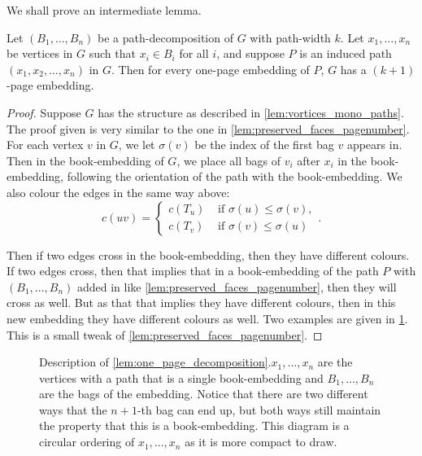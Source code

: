 We shall prove an intermediate lemma.
\begin{lemma}\label{lem:one_page_decomposition}
	Let \((B_1, \ldots, B_n)\) be a path-decomposition of \(G\) with path-width \(k\). Let \(x_1, \ldots, x_n\) be vertices in \(G\) such that \(x_i \in B_i\) for all \(i\), and suppose \(P\) is an induced path \((x_1, x_2, \ldots, x_n)\) in \(G\). Then for every one-page embedding of \(P\), \(G\) has a \((k + 1)\)-page embedding.
\end{lemma}
\begin{proof}
	Suppose \(G\) has the structure as described in \cref{lem:vortices_mono_paths}. 
	The proof given is very similar to the one in \cref{lem:preserved_faces_pagenumber}. For each vertex \(v\) in \(G\), we let \(\sigma(v)\) be the index of the first bag \(v\) appears in. Then in the book-embedding of \(G\), we place all bags of \(v_i\) after \(x_i\) in the book-embedding, following the orientation of the path with the book-embedding. We also colour the edges in the same way above: 
	\begin{equation}
		c(uv) =
		\begin{cases}
			c(T_u) & \text{ if } \sigma(u) \leq \sigma(v), \\
			c(T_v) & \text{ if } \sigma(v) \leq \sigma(u)
		\end{cases}.
	\end{equation}

	Then if two edges cross in the book-embedding, then they have different colours. If two edges cross, then that implies that in a book-embedding of the path \(P\) with \((B_1, \ldots, B_n)\) added in like \cref{lem:preserved_faces_pagenumber}, then they will cross as well. But as that that implies they have different colours, then in this new embedding they have different colours as well. Two examples are given in \cref{fig:preserving_pages}.
	This is a small tweak of \cref{lem:preserved_faces_pagenumber}. 
\end{proof}

\begin{figure}[h!]
	\centering
	
	\caption[One-page decomposition]{Description of \cref{lem:one_page_decomposition}.\(x_1, \ldots, x_n\) are the vertices with a path that is a single book-embedding and \(B_1, \ldots, B_n\) are the bags of the embedding. Notice that there are two different ways that the \(n + 1\)-th bag can end up, but both ways still maintain the property that this is a book-embedding. This diagram is a circular ordering of \(x_1, \ldots, x_n\) as it is more compact to draw.}\label{fig:preserving_pages}
\end{figure}

